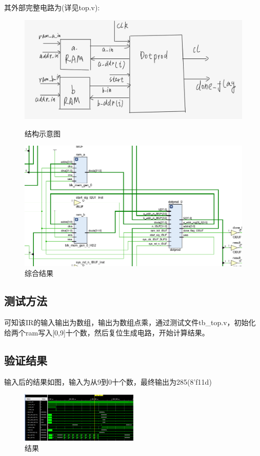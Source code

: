 \documentclass[12pt,hyperref,a4paper,UTF8]{ctexart}
\begin{document}
其外部完整电路为(详见top.v):

\begin{figure}[htbp]
    \centering
    \begin{minipage}{0.45\textwidth}
        \includegraphics[width=\linewidth]{./figures/结构示意图.png}
        \caption{结构示意图}
        \label{fig:sub1}
    \end{minipage}
    \hfill %
    \begin{minipage}{0.45\textwidth}
        \includegraphics[width=\linewidth]{./figures/综合结果.png}
        \caption{综合结果}
        \label{fig:sub2}
    \end{minipage}
\end{figure}

\subsection{测试方法}

可知该IR的输入输出为数组，输出为数组点乘，通过测试文件tb_top.v，初始化给两个ram写入[0,9]十个数，然后复位生成电路，开始计算结果。

\subsection{验证结果}
输入后的结果如图，输入为从9到0十个数，最终输出为285(8'f11d)
\begin{figure}[htbp]
    \centering
    \includegraphics[width=0.5\textwidth]{figures/仿真结果.png}
    \caption{结果}
    \label{fig:仿真结果}
\end{figure}
\end{document}
